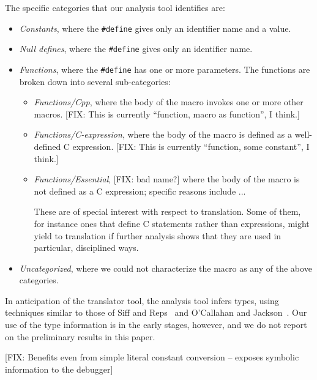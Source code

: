The specific categories that our analysis tool identifies are:
\begin{itemize}

\item {\em Constants\/}, where the \verb+#define+ gives only an
identifier name and a value.

\item {\em Null defines\/}, where the \verb+#define+ gives only an
identifier name.

\item {\em Functions\/}, where the \verb+#define+ has one or more
parameters.  The functions are broken down into several sub-categories:
\begin{itemize}

\item {\em Functions/Cpp\/}, where the body of the macro invokes one
or more other macros.  [FIX: This is currently ``function, macro as
function'', I think.]

\item {\em Functions/C-expression\/}, where the body of the macro is
defined as a well-defined C expression.  [FIX: This is currently
``function, some constant'', I think.]

\item {\em Functions/Essential\/}, [FIX: bad name?] where the body of the
macro is not defined as a C expression; specific reasons include
...

These are of special interest with respect to translation.  Some of
them, for instance ones that define C statements rather than
expressions, might yield to translation if further analysis shows that
they are used in particular, disciplined ways.

\end{itemize}

\item {\em Uncategorized\/}, where we could not characterize the macro
as any of the above categories.

\end{itemize}

In anticipation of the translator tool, the analysis tool infers
types, using techniques similar to those of Siff and Reps~\cite{Siff-fse96}
and O'Callahan and Jackson~\cite{OCallahan-icse97}.  Our use of the
type information is in the early stages, however, and we do not report
on the preliminary results in this paper.

[FIX: Benefits even from simple literal constant conversion -- exposes
symbolic information to the debugger]

